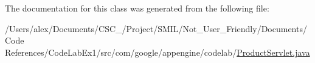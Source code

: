 The documentation for this class was generated from the following file\-:\begin{DoxyCompactItemize}
\item 
/\-Users/alex/\-Documents/\-C\-S\-C\-\_/\-Project/\-S\-M\-I\-L/\-Not\-\_\-\-User\-\_\-\-Friendly/\-Documents/\-Code References/\-Code\-Lab\-Ex1/src/com/google/appengine/codelab/\hyperlink{_product_servlet_8java}{Product\-Servlet.\-java}\end{DoxyCompactItemize}
